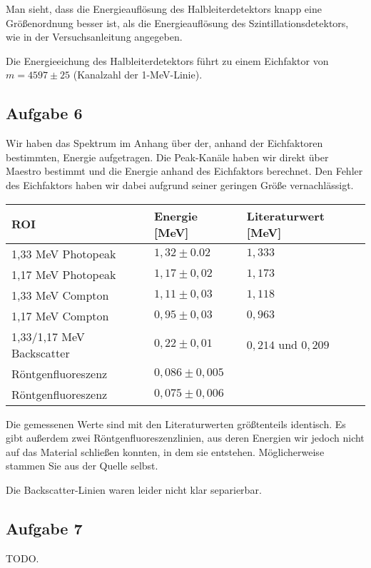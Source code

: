 \documentclass[a4paper,german,12pt,smallheadings]{scrartcl}
\begin{document}
Man sieht, dass die Energieauflösung des Halbleiterdetektors knapp eine
Größenordnung besser ist, als die Energieauflösung des Szintillationsdetektors,
wie in der Versuchsanleitung angegeben.

Die Energieeichung des Halbleiterdetektors führt zu einem Eichfaktor von $m =
4597\pm25$ (Kanalzahl der 1-MeV-Linie).


\subsection{Aufgabe 6}

Wir haben das Spektrum im Anhang über der, anhand der Eichfaktoren bestimmten,
Energie aufgetragen. Die Peak-Kanäle haben wir direkt über Maestro bestimmt und
die Energie anhand des Eichfaktors berechnet. Den Fehler des Eichfaktors haben
wir dabei aufgrund seiner geringen Größe vernachlässigt.

\begin{tabular}{l|l|l}
  ROI & Energie [MeV] & Literaturwert [MeV]\\
  \hline
  1{,}33 MeV Photopeak & $1,32\pm0.02$ & $1,333$\\
  1{,}17 MeV Photopeak & $1,17\pm0,02$ & $1,173$\\
  1{,}33 MeV Compton   & $1,11\pm0,03$ & $1,118$\\
  1{,}17 MeV Compton   & $0,95\pm0,03$ & $0,963$\\
  1{,}33/1{,}17 MeV Backscatter   & $0,22\pm0,01$ & $0,214$ und $0,209$\\
  Röntgenfluoreszenz   & $0,086\pm0,005$\\
  Röntgenfluoreszenz   & $0,075\pm0,006$
\end{tabular}
\vspace{22pt}

Die gemessenen Werte sind mit den Literaturwerten größtenteils identisch. Es
gibt außerdem zwei Röntgenfluoreszenzlinien, aus deren Energien wir jedoch
nicht auf das Material schließen konnten, in dem sie entstehen. Möglicherweise
stammen Sie aus der Quelle selbst.

Die Backscatter-Linien waren leider nicht klar separierbar.

\subsection{Aufgabe 7}

TODO.

\begin{landscape}
  
\end{landscape}
\begin{landscape}
  
\end{landscape}
\begin{landscape}
  
\end{landscape}
\end{document}
